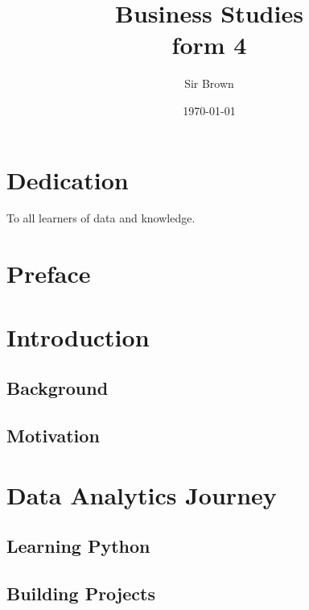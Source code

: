 \documentclass[12pt,a4paper, openany]{book}
\begin{document}
\frontmatter
\title{Business Studies \\ form 4}
\author{Sir Brown}
\date{\today}

\maketitle

\chapter*{Dedication}
To all learners of data and knowledge.

\chapter*{Preface}
\lipsum[1] %

\tableofcontents

\mainmatter
\chapter{Introduction}
\section{Background}
\lipsum[2]

\section{Motivation}
\lipsum[3]

\chapter{Data Analytics Journey}
\section{Learning Python}
\lipsum[4]

\section{Building Projects}
\lipsum[5]

\backmatter

\nocite{*}
\printbibliography{}
\end{document}
